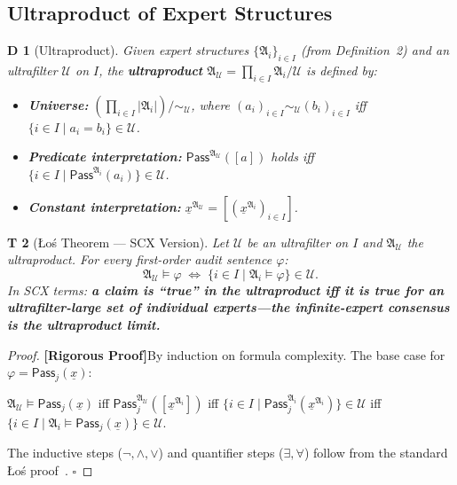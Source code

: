 \documentclass[12pt,a4paper]{article}
\newtheorem{theorem}Theorem[section]
\newtheorem{definition}[theorem]Definition
\theoremstyle{remark}
\newcommand{\Ultrafilter}{\mathcal{U}}
\newcommand{\Struct}{\mathfrak{A}}
\newcommand{\rigorous}{\textnormal{\textbf{[Rigorous Proof]}}}
\begin{document}
\subsection{Ultraproduct of Expert Structures}
\begin{definition}[Ultraproduct]
Given expert structures \(\{\Struct_i\}_{i \in I}\) (from Definition~2) and an ultrafilter \(\Ultrafilter\) on \(I\), the \textbf{ultraproduct} \(\Struct_{\Ultrafilter} = \prod_{i \in I} \Struct_i / \Ultrafilter\) is defined by:
\begin{itemize}[itemsep=3pt]
    \item \textbf{Universe:} \((\prod_{i \in I} |\Struct_i|) / \sim_{\Ultrafilter}\), where \((a_i)_{i \in I} \sim_{\Ultrafilter} (b_i)_{i \in I}\) iff \(\{i \in I \mid a_i = b_i\} \in \Ultrafilter\).
    \item \textbf{Predicate interpretation:} \(\mathsf{Pass}^{\Struct_{\Ultrafilter}}([a])\) holds iff \(\{i \in I \mid \mathsf{Pass}^{\Struct_i}(a_i)\} \in \Ultrafilter\).
    \item \textbf{Constant interpretation:} \(\underline{x}^{\Struct_{\Ultrafilter}} = [(\underline{x}^{\Struct_i})_{i \in I}]\).
\end{itemize}
\end{definition}

\begin{theorem}[Łoś Theorem --- SCX Version]\label{thm:los_scx}
Let \(\Ultrafilter\) be an ultrafilter on \(I\) and \(\Struct_{\Ultrafilter}\) the ultraproduct. For every first-order audit sentence \(\varphi\):
\begin{equation}\label{eq:los}
    \Struct_{\Ultrafilter} \models \varphi
    \;\Longleftrightarrow\;
    \{i \in I \mid \Struct_i \models \varphi\} \in \Ultrafilter.
\end{equation}
In SCX terms: \textbf{a claim is ``true'' in the ultraproduct iff it is true for an ultrafilter-large set of individual experts---the infinite-expert consensus is the ultraproduct limit.}
\end{theorem}
\begin{proof}
\rigorous By induction on formula complexity. The base case for \(\varphi = \mathsf{Pass}_j(\underline{x})\):

\(\Struct_{\Ultrafilter} \models \mathsf{Pass}_j(\underline{x})\) iff \(\mathsf{Pass}_j^{\Struct_{\Ultrafilter}}([\underline{x}^{\Struct_i}])\) iff \(\{i \in I \mid \mathsf{Pass}_j^{\Struct_i}(\underline{x}^{\Struct_i})\} \in \Ultrafilter\) iff \(\{i \in I \mid \Struct_i \models \mathsf{Pass}_j(\underline{x})\} \in \Ultrafilter\).

The inductive steps (\(\neg, \land, \lor\)) and quantifier steps (\(\exists, \forall\)) follow from the standard Łoś proof~\cite{los1955}. \(\square\)
\end{proof}
\end{document}
